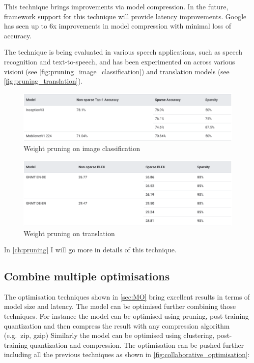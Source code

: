 This technique brings improvements via model compression. In the future,
framework support for this technique will provide latency improvements.
Google has seen up to 6x improvements in model compression with minimal loss of
accuracy.

The technique is being evaluated in various speech applications, such as speech
recognition and text-to-speech, and has been experimented on across various
visioni (see \autoref{fig:pruning_image_classification}) and translation
models (see \autoref{fig:pruning_translation}).~\cite{tfmot:pruning}

\begin{figure}[ht]
    \includegraphics[width=\textwidth]{images/introduction/pruning_image_classification.png}
    \centering
    \caption{Weight pruning on image classification}\label{fig:pruning_image_classification}
\end{figure}

\begin{figure}[ht]
    \includegraphics[width=\textwidth]{images/introduction/pruning_translation.png}
    \centering
    \caption{Weight pruning on translation}\label{fig:pruning_translation}
\end{figure}

In \autoref{ch:pruning} I will go more in details of this technique.

\subsection{Combine multiple optimisations}
The optimisation techniques shown in \autoref{sec:MO} bring excellent results
in terms of model size and latency.
The model can be optimised further combining those techniques. For instance the
model can be optimised using pruning, post-training quantization and then
compress the result with any compression algorithm (e.g.\ zip, gzip)
Similarly the model can be optimised using clustering, post-training
quantization and compression.
The optimisation can be pushed further including all the previous techniques as
shown in \autoref{fig:collaborative_optimisation}:

